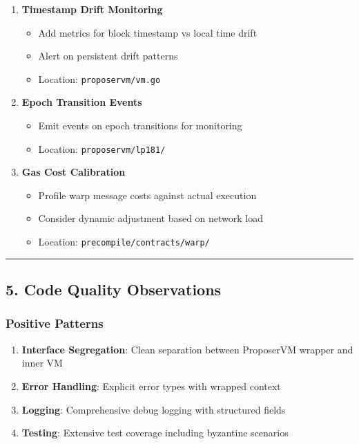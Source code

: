 \documentclass[
]{article}
\providecommand{\tightlist}{%
  \setlength{\itemsep}{0pt}\setlength{\parskip}{0pt}}
\begin{document}
\begin{enumerate}
\def\labelenumi{\arabic{enumi}.}
\item
  \textbf{Timestamp Drift Monitoring}

  \begin{itemize}
  \tightlist
  \item
    Add metrics for block timestamp vs local time drift
  \item
    Alert on persistent drift patterns
  \item
    Location: \texttt{proposervm/vm.go}
  \end{itemize}
\item
  \textbf{Epoch Transition Events}

  \begin{itemize}
  \tightlist
  \item
    Emit events on epoch transitions for monitoring
  \item
    Location: \texttt{proposervm/lp181/}
  \end{itemize}
\item
  \textbf{Gas Cost Calibration}

  \begin{itemize}
  \tightlist
  \item
    Profile warp message costs against actual execution
  \item
    Consider dynamic adjustment based on network load
  \item
    Location: \texttt{precompile/contracts/warp/}
  \end{itemize}
\end{enumerate}

\begin{center}\rule{0.5\linewidth}{0.5pt}\end{center}

\subsection{5. Code Quality
Observations}\label{5-code-quality-observations}

\subsubsection{Positive Patterns}\label{positive-patterns}

\begin{enumerate}
\def\labelenumi{\arabic{enumi}.}
\tightlist
\item
  \textbf{Interface Segregation}: Clean separation between ProposerVM
  wrapper and inner VM
\item
  \textbf{Error Handling}: Explicit error types with wrapped context
\item
  \textbf{Logging}: Comprehensive debug logging with structured fields
\item
  \textbf{Testing}: Extensive test coverage including byzantine
  scenarios
\end{enumerate}
\end{document}
